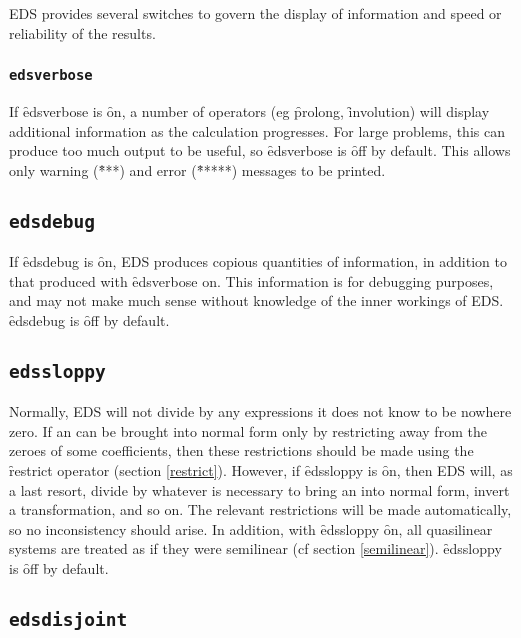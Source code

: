 EDS provides several switches to govern the display of information and 
speed or reliability of the results.

\subsubsection{\tt edsverbose}
\label{edsverbose}

If \f{edsverbose} is \f{on}, a number of operators (eg \f{prolong},
\f{involution}) will display additional information as the calculation
progresses. For large problems, this can produce too much output to be
useful, so \f{edsverbose} is \f{off} by default. This allows only warning
(\f{***}) and error (\f{*****}) messages to be printed.

\subsection{\tt edsdebug}
\label{edsdebug}

If \f{edsdebug} is \f{on}, EDS produces copious quantities of information,
in addition to that produced with \f{edsverbose} on. This information is
for debugging purposes, and may not make much sense without knowledge of
the inner workings of EDS. \f{edsdebug} is \f{off} by default.

\subsection{\tt edssloppy}
\label{edssloppy}

Normally, EDS will not divide by any expressions it does not know to be
nowhere zero. If an  can be brought into normal form only by
restricting away from the zeroes of some coefficients, then these
restrictions should be made using the \f{restrict} operator (section
\ref{restrict}). However, if \f{edssloppy} is \f{on}, then EDS will, as a
last resort, divide by whatever is necessary to bring an  into
normal form, invert a transformation, and so on. The relevant restrictions
will be made automatically, so no inconsistency should arise. In addition,
with \f{edssloppy} \f{on}, all quasilinear systems are treated as if they
were semilinear (cf section \ref{semilinear}). \f{edssloppy} is \f{off} by
default.


\subsection{\tt edsdisjoint}
\label{edsdisjoint}

